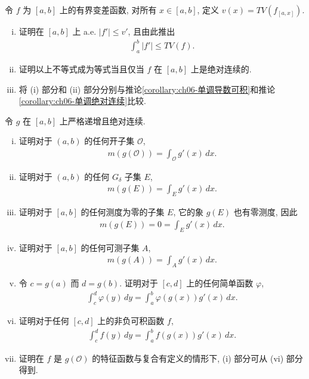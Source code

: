 \documentclass[../../main.tex]{subfiles}
\begin{document}
\begin{exercise}\label{exercise:ch06-55}
令 $f$ 为 $[a,b]$ 上的有界变差函数, 对所有 $x\in[a,b]$, 定义 $v(x)=TV(f_{[a,x]})$.
\begin{enumerate}[(i)]
\item 证明在 $[a,b]$ 上 a.e. $|f'|\leqslant v'$, 且由此推出
\begin{align*}
\int_{a}^{b}|f'|\leqslant TV(f).
\end{align*}
\item 证明以上不等式成为等式当且仅当 $f$ 在 $[a,b]$ 上是绝对连续的.
\item 将 (i) 部分和 (ii) 部分分别与推论\cref{corollary:ch06-单调导数可积}和推论\cref{corollary:ch06-单调绝对连续}比较.
\end{enumerate}
\end{exercise}

\begin{exercise}\label{exercise:ch06-56}
令 $g$ 在 $[a,b]$ 上严格递增且绝对连续.
\begin{enumerate}[(i)]
\item 证明对于 $(a,b)$ 的任何开子集 $\mathcal{O}$,
\begin{align*}
m(g(\mathcal{O}))=\int_{\mathcal{O}}g'(x)\,dx.
\end{align*}
\item 证明对于 $(a,b)$ 的任何 $G_{\delta}$ 子集 $E$,
\begin{align*}
m(g(E))=\int_{E}g'(x)\,dx.
\end{align*}
\item 证明对于 $[a,b]$ 的任何测度为零的子集 $E$, 它的象 $g(E)$ 也有零测度, 因此
\begin{align*}
m(g(E))=0=\int_{E}g'(x)\,dx.
\end{align*}
\item 证明对于 $[a,b]$ 的任何可测子集 $A$,
\begin{align*}
m(g(A))=\int_{A}g'(x)\,dx.
\end{align*}
\item 令 $c=g(a)$ 而 $d=g(b)$. 证明对于 $[c,d]$ 上的任何简单函数 $\varphi$,
\begin{align*}
\int_{c}^{d}\varphi(y)\,dy=\int_{a}^{b}\varphi(g(x))g'(x)\,dx.
\end{align*}
\item 证明对于任何 $[c,d]$ 上的非负可积函数 $f$,
\begin{align*}
\int_{c}^{d}f(y)\,dy=\int_{a}^{b}f(g(x))g'(x)\,dx.
\end{align*}
\item 证明在 $f$ 是 $g(\mathcal{O})$ 的特征函数与复合有定义的情形下, (i) 部分可从 (vi) 部分得到.
\end{enumerate}
\end{exercise}
\end{document}
